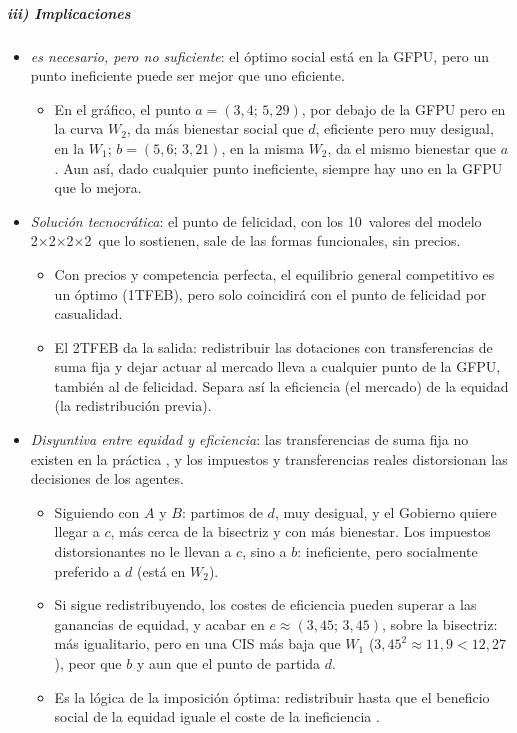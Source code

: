 \documentclass[11pt]{article}
\begin{document}
\subparagraph{iii) Implicaciones}

\begin{itemize}
\item \emph{ es necesario, pero no suficiente}: el óptimo social está en la GFPU, pero un punto ineficiente puede ser mejor que uno eficiente.
  \begin{itemize}
  \item En el gráfico, el punto $a=(3{,}4;\,5{,}29)$, por debajo de la GFPU pero en la curva $W_2$, da más bienestar social que $d$, eficiente pero muy desigual, en la $W_1$; $b=(5{,}6;\,3{,}21)$, en la misma $W_2$, da el mismo bienestar que $a$. Aun así, dado cualquier punto ineficiente, siempre hay uno en la GFPU que lo mejora.
  \end{itemize}
\item \emph{Solución tecnocrática}: el punto de felicidad, con los 10~valores del modelo 2×2×2×2~que lo sostienen, sale de las formas funcionales, sin precios.
  \begin{itemize}
  \item Con precios y competencia perfecta, el equilibrio general competitivo es un óptimo (1TFEB), pero solo coincidirá con el punto de felicidad por casualidad.
  \item El 2TFEB da la salida: redistribuir las dotaciones con transferencias de suma fija y dejar actuar al mercado lleva a cualquier punto de la GFPU, también al de felicidad. Separa así la eficiencia (el mercado) de la equidad (la redistribución previa).
  \end{itemize}
\item \emph{Disyuntiva entre equidad y eficiencia}: las transferencias de suma fija no existen en la práctica , y los impuestos y transferencias reales distorsionan las decisiones de los agentes.
  \begin{itemize}
  \item Siguiendo con $A$ y $B$: partimos de $d$, muy desigual, y el Gobierno quiere llegar a $c$, más cerca de la bisectriz y con más bienestar. Los impuestos distorsionantes no le llevan a $c$, sino a $b$: ineficiente, pero socialmente preferido a $d$ (está en $W_2$).
  \item Si sigue redistribuyendo, los costes de eficiencia pueden superar a las ganancias de equidad, y acabar en $e\approx(3{,}45;\,3{,}45)$, sobre la bisectriz: más igualitario, pero en una CIS más baja que $W_1$ ($3{,}45^2\approx11{,}9<12{,}27$), peor que $b$ y aun que el punto de partida $d$.
  \item Es la lógica de la imposición óptima: redistribuir hasta que el beneficio social de la equidad iguale el coste de la ineficiencia .
  \end{itemize}
\end{itemize}
\end{document}

